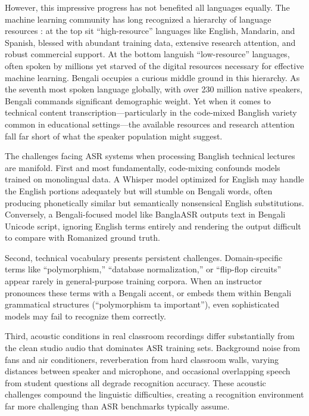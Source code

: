 However, this impressive progress has not benefited all languages equally. The machine learning community has long recognized a hierarchy of language resources \cite{Conneau2021}: at the top sit ``high-resource'' languages like English, Mandarin, and Spanish, blessed with abundant training data, extensive research attention, and robust commercial support. At the bottom languish ``low-resource'' languages, often spoken by millions yet starved of the digital resources necessary for effective machine learning. Bengali occupies a curious middle ground in this hierarchy. As the seventh most spoken language globally, with over 230 million native speakers, Bengali commands significant demographic weight. Yet when it comes to technical content transcription---particularly in the code-mixed Banglish variety common in educational settings---the available resources and research attention fall far short of what the speaker population might suggest.

The challenges facing ASR systems when processing Banglish technical lectures are manifold. First and most fundamentally, code-mixing confounds models trained on monolingual data. A Whisper model optimized for English may handle the English portions adequately but will stumble on Bengali words, often producing phonetically similar but semantically nonsensical English substitutions. Conversely, a Bengali-focused model like BanglaASR outputs text in Bengali Unicode script, ignoring English terms entirely and rendering the output difficult to compare with Romanized ground truth.

Second, technical vocabulary presents persistent challenges. Domain-specific terms like ``polymorphism,'' ``database normalization,'' or ``flip-flop circuits'' appear rarely in general-purpose training corpora. When an instructor pronounces these terms with a Bengali accent, or embeds them within Bengali grammatical structures (``polymorphism ta important''), even sophisticated models may fail to recognize them correctly.

Third, acoustic conditions in real classroom recordings differ substantially from the clean studio audio that dominates ASR training sets. Background noise from fans and air conditioners, reverberation from hard classroom walls, varying distances between speaker and microphone, and occasional overlapping speech from student questions all degrade recognition accuracy. These acoustic challenges compound the linguistic difficulties, creating a recognition environment far more challenging than ASR benchmarks typically assume.

